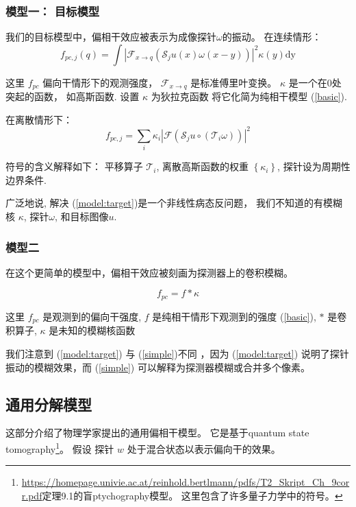\documentclass[12pt]{article}
\begin{document}
\subsubsection{模型一： 目标模型\cite{chang}}
我们的目标模型中，偏相干效应被表示为成像探针$\omega$的振动。 在连续情形：
\begin{equation}
f_{p c, j}(q) = \int\left|\mathcal{F}_{x \rightarrow q}\left(\mathcal{S}_{j} u(x) \omega(x-y)\right)\right|^{2} \kappa(y) \mathrm{dy} 
\end{equation}

这里 $f_{p c}$ 偏向干情形下的观测强度， $\mathcal{F}_{x \rightarrow q}$ 是标准傅里叶变换。 $\kappa$ 是一个在0处突起的函数， 如高斯函数. 设置 $\kappa$ 为狄拉克函数 将它化简为纯相干模型 (\ref{basic}).

在离散情形下：
\begin{equation}
f_{p c, j}=\sum_{i} \kappa_{i}\left|\mathcal{F}\left( \mathcal{S}_{j} u \circ \left(\mathcal{T}_{i} \omega\right) \right)\right|^{2}
\label{model:target}
\end{equation}


符号的含义解释如下： 平移算子 $\mathcal{T}_{i}$, 离散高斯函数的权重 $\left\{\kappa_{i}\right\}$, 探针设为周期性边界条件.

广泛地说, 解决 (\ref{model:target})是一个非线性病态反问题， 我们不知道的有模糊核 $\kappa$, 探针$\omega$, 和目标图像$u$. 



\subsubsection{模型二\cite{psf}}
在这个更简单的模型中，偏相干效应被刻画为探测器上的卷积模糊。

\begin{equation}
\label{simple}
f_{p c}=f * \kappa
\end{equation}

这里 $f_{p c}$ 是观测到的偏向干强度, $f$ 是纯相干情形下观测到的强度 (\ref{basic}), $*$ 是卷积算子,  $\kappa$ 是未知的模糊核函数 



我们注意到 (\ref{model:target}) 与
(\ref{simple})不同 ，因为 (\ref{model:target}) 说明了探针振动的模糊效果，而 (\ref{simple}) 可以解释为探测器模糊或合并多个像素。

\subsection{通用分解模型}
这部分介绍了物理学家提出的通用偏相干模型\cite{mix}。 它是基于quantum state tomography\footnote{\url{https://homepage.univie.ac.at/reinhold.bertlmann/pdfs/T2_Skript_Ch_9corr.pdf}定理9.1的盲ptychography模型。 这里包含了许多量子力学中的符号。}。 假设 探针 $w$ 处于混合状态以表示偏向干的效果。
\end{document}

